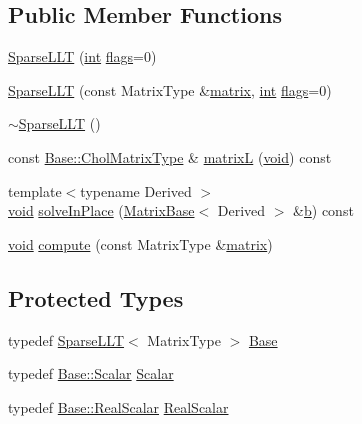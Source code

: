 \subsection*{Public Member Functions}
\begin{DoxyCompactItemize}
\item 
\hyperlink{class_sparse_l_l_t_3_01_matrix_type_00_01_taucs_01_4_a4e3ca2677c8458f64be2ef7d4ae682ae}{Sparse\-L\-L\-T} (\hyperlink{ioapi_8h_a787fa3cf048117ba7123753c1e74fcd6}{int} \hyperlink{class_sparse_l_l_t_a7649229f826139f5c457f91e1fc996ce}{flags}=0)
\item 
\hyperlink{class_sparse_l_l_t_3_01_matrix_type_00_01_taucs_01_4_a08ff908c86097c963435f3687459431d}{Sparse\-L\-L\-T} (const Matrix\-Type \&\hyperlink{glext_8h_a7b24a3f2f56eb1244ae69dacb4fecb6f}{matrix}, \hyperlink{ioapi_8h_a787fa3cf048117ba7123753c1e74fcd6}{int} \hyperlink{class_sparse_l_l_t_a7649229f826139f5c457f91e1fc996ce}{flags}=0)
\item 
\hyperlink{class_sparse_l_l_t_3_01_matrix_type_00_01_taucs_01_4_a56f1217053fd190fded9190cb98e90ce}{$\sim$\-Sparse\-L\-L\-T} ()
\item 
const \hyperlink{class_sparse_l_l_t_a2c9d9dfe18d1e70b0f46de8c9d106bf2}{Base\-::\-Chol\-Matrix\-Type} \& \hyperlink{class_sparse_l_l_t_3_01_matrix_type_00_01_taucs_01_4_ac2c8e9f3de0e331886c6f8f0b20be503}{matrix\-L} (\hyperlink{group___u_a_v_objects_plugin_ga444cf2ff3f0ecbe028adce838d373f5c}{void}) const 
\item 
{\footnotesize template$<$typename Derived $>$ }\\\hyperlink{group___u_a_v_objects_plugin_ga444cf2ff3f0ecbe028adce838d373f5c}{void} \hyperlink{class_sparse_l_l_t_3_01_matrix_type_00_01_taucs_01_4_a3e525f8e674f60ade14084772e5395f7}{solve\-In\-Place} (\hyperlink{class_matrix_base}{Matrix\-Base}$<$ Derived $>$ \&\hyperlink{glext_8h_a6eba317e3cf44d6d26c04a5a8f197dcb}{b}) const 
\item 
\hyperlink{group___u_a_v_objects_plugin_ga444cf2ff3f0ecbe028adce838d373f5c}{void} \hyperlink{class_sparse_l_l_t_3_01_matrix_type_00_01_taucs_01_4_a181544aedd01cc536fbf6d2b36ca8833}{compute} (const Matrix\-Type \&\hyperlink{glext_8h_a7b24a3f2f56eb1244ae69dacb4fecb6f}{matrix})
\end{DoxyCompactItemize}
\subsection*{Protected Types}
\begin{DoxyCompactItemize}
\item 
typedef \hyperlink{class_sparse_l_l_t}{Sparse\-L\-L\-T}$<$ Matrix\-Type $>$ \hyperlink{class_sparse_l_l_t_3_01_matrix_type_00_01_taucs_01_4_aa32ceb8ea9072662365579ce983b2d4d}{Base}
\item 
typedef \hyperlink{class_sparse_l_l_t_acc629078ed9cd42c5d1d2c16012de3a4}{Base\-::\-Scalar} \hyperlink{class_sparse_l_l_t_3_01_matrix_type_00_01_taucs_01_4_a4605049d6c6de0e621127a55058c6ed9}{Scalar}
\item 
typedef \hyperlink{class_sparse_l_l_t_a20661706ee54d830837a844d675fb236}{Base\-::\-Real\-Scalar} \hyperlink{class_sparse_l_l_t_3_01_matrix_type_00_01_taucs_01_4_afc3f7bd032d6700143cc6ee76c93800f}{Real\-Scalar}
\end{DoxyCompactItemize}
